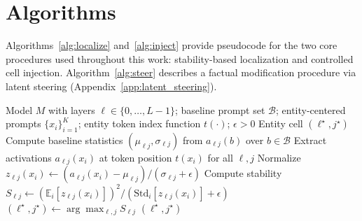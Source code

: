 \documentclass[10pt,twocolumn]{article}
\begin{document}
\section{Algorithms}
\label{app:algorithms}
Algorithms~\ref{alg:localize} and~\ref{alg:inject} provide pseudocode for the two core procedures used throughout this work: stability-based localization and controlled cell injection. Algorithm~\ref{alg:steer} describes a factual modification procedure via latent steering (Appendix~\ref{app:latent_steering}).

\begin{algorithm}[!h]
\caption{Stability-based localization of an entity cell}
\label{alg:localize}
\begin{algorithmic}[1]
\Require Model $M$ with layers $\ell \in \{0,\dots,L-1\}$; baseline prompt set $\mathcal{B}$; entity-centered prompts $\{x_i\}_{i=1}^K$; entity token index function $t(\cdot)$; $\epsilon>0$
\Ensure Entity cell $(\ell^\star, j^\star)$
\State Compute baseline statistics $(\mu_{\ell j}, \sigma_{\ell j})$ from $a_{\ell j}(b)$ over $b\in\mathcal{B}$
\State Extract activations $a_{\ell j}(x_i)$ at token position $t(x_i)$ for all $\ell,j$
\State Normalize $z_{\ell j}(x_i) \gets (a_{\ell j}(x_i) - \mu_{\ell j})/(\sigma_{\ell j}+\epsilon)$
\EndFor
\State Compute stability $S_{\ell j} \gets (\mathbb{E}_i[z_{\ell j}(x_i)])^2 / (\mathrm{Std}_i[z_{\ell j}(x_i)] + \epsilon)$
\State $(\ell^\star, j^\star) \gets \arg\max_{\ell,j} S_{\ell j}$
\State \Return $(\ell^\star, j^\star)$
\end{algorithmic}
\end{algorithm}
\end{document}
